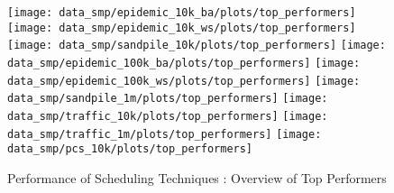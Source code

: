 \documentclass[12pt]{article}
\begin{document}
\begin{figure}
    \texttt{[image: data\_smp/epidemic\_10k\_ba/plots/top\_performers]}\quad
    \texttt{[image: data\_smp/epidemic\_10k\_ws/plots/top\_performers]}\quad
    \texttt{[image: data\_smp/sandpile\_10k/plots/top\_performers]}
    \medskip
    \texttt{[image: data\_smp/epidemic\_100k\_ba/plots/top\_performers]}\quad
    \texttt{[image: data\_smp/epidemic\_100k\_ws/plots/top\_performers]}\quad
    \texttt{[image: data\_smp/sandpile\_1m/plots/top\_performers]}
    \medskip
    \texttt{[image: data\_smp/traffic\_10k/plots/top\_performers]}\quad
    \texttt{[image: data\_smp/traffic\_1m/plots/top\_performers]}\quad
    \texttt{[image: data\_smp/pcs\_10k/plots/top\_performers]}
    \caption*{Performance of Scheduling Techniques : Overview of Top Performers}
\end{figure}
\end{document}

